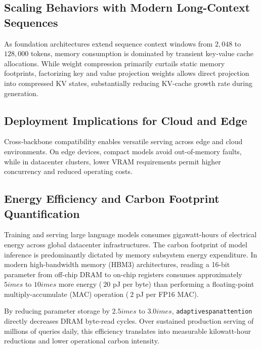 \subsection{Scaling Behaviors with Modern Long-Context Sequences}
As foundation architectures extend sequence context windows from $2{,}048$ to $128{,}000$ tokens, memory consumption is dominated by transient key-value cache allocations. While weight compression primarily curtails static memory footprints, factorizing key and value projection weights allows direct projection into compressed KV states, substantially reducing KV-cache growth rate during generation.

\subsection{Deployment Implications for Cloud and Edge}
Cross-backbone compatibility enables versatile serving across edge and cloud environments. On edge devices, compact models avoid out-of-memory faults, while in datacenter clusters, lower VRAM requirements permit higher concurrency and reduced operating costs.

\subsection{Energy Efficiency and Carbon Footprint Quantification}
Training and serving large language models consumes gigawatt-hours of electrical energy across global datacenter infrastructures. The carbon footprint of model inference is predominantly dictated by memory subsystem energy expenditure. In modern high-bandwidth memory (HBM3) architectures, reading a 16-bit parameter from off-chip DRAM to on-chip registers consumes approximately $5	imes$ to $10	imes$ more energy ($~20$ pJ per byte) than performing a floating-point multiply-accumulate (MAC) operation ($~2$ pJ per FP16 MAC).

By reducing parameter storage by $2.5	imes$ to $3.0	imes$, \texttt{adaptivespanattention} directly decreases DRAM byte-read cycles. Over sustained production serving of millions of queries daily, this efficiency translates into measurable kilowatt-hour reductions and lower operational carbon intensity.
